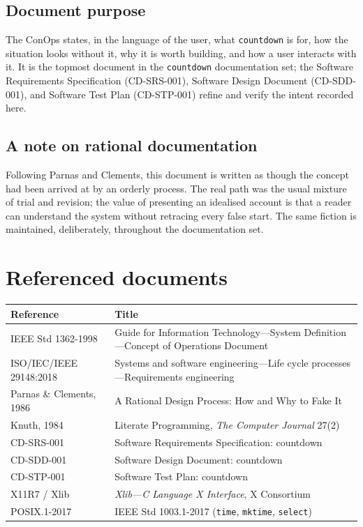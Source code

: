 \documentclass[12pt]{article}
\newcommand{\code}[1]{\texttt{#1}}
\begin{document}
\subsection{Document purpose}

The ConOps states, in the language of the user, what \code{countdown} is
for, how the situation looks without it, why it is worth building, and how
a user interacts with it.  It is the topmost document in the
\code{countdown} documentation set; the Software Requirements
Specification (CD-SRS-001), Software Design Document (CD-SDD-001), and
Software Test Plan (CD-STP-001) refine and verify the intent recorded
here.

\subsection{A note on rational documentation}

Following Parnas and Clements, this document is written as though the
concept had been arrived at by an orderly process.  The real path was the
usual mixture of trial and revision; the value of presenting an idealised
account is that a reader can understand the system without retracing every
false start.  The same fiction is maintained, deliberately, throughout the
documentation set.

\section{Referenced documents}

\begin{longtable}{p{}p{}}
\toprule
\textbf{Reference} & \textbf{Title} \\
\midrule
IEEE Std 1362-1998 & Guide for Information Technology---System Definition---Concept of Operations Document \\
ISO/IEC/IEEE 29148:2018 & Systems and software engineering---Life cycle processes---Requirements engineering \\
Parnas \& Clements, 1986 & A Rational Design Process: How and Why to Fake It \\
Knuth, 1984 & Literate Programming, \textit{The Computer Journal} 27(2) \\
CD-SRS-001 & Software Requirements Specification: countdown \\
CD-SDD-001 & Software Design Document: countdown \\
CD-STP-001 & Software Test Plan: countdown \\
X11R7 / Xlib & \textit{Xlib---C Language X Interface}, X Consortium \\
POSIX.1-2017 & IEEE Std 1003.1-2017 (\code{time}, \code{mktime}, \code{select}) \\
\bottomrule
\end{longtable}
\end{document}
